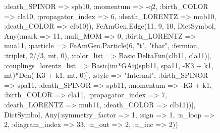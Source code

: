 \documentclass{revtex4}
\begin{document}
\begin{figure}[!htb]
\begin{center}
{:death_SPINOR => spb10, :momentum => -q2, :birth_COLOR => cla10, :propagator_index => 6, :death_LORENTZ => mub10, :death_COLOR => clb10)), FeAmGen.Edge(11, 9, 10, Dict{Symbol, Any}(:mark => 11, :null_MOM => 0, :birth_LORENTZ => mua11, :particle => FeAmGen.Particle(6, "t", "tbar", :fermion, :triplet, 2//3, mt, 0), :color_list => Basic[DeltaFun(clb11, cla11)], :couplings_lorentz_list => Basic[im*GAij(spb11, spa11, -K3 + k1, mt)*Den(-K3 + k1, mt, 0)], :style => "Internal", :birth_SPINOR => spa11, :death_SPINOR => spb11, :momentum => -K3 + k1, :birth_COLOR => cla11, :propagator_index => 7, :death_LORENTZ => mub11, :death_COLOR => clb11))], Dict{Symbol, Any}(:symmetry_factor => 1, :sign => 1, :n_loop => 2, :diagram_index => 33, :n_out => 2, :n_inc => 2)) 
}
\end{center}
\end{figure}
\end{document}
